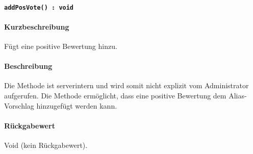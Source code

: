 \paragraph{\texttt{addPosVote() : void}}%
\paragraph*{Kurzbeschreibung}
Fügt eine positive Bewertung hinzu.
\paragraph*{Beschreibung}
Die Methode ist serverintern und wird somit nicht explizit vom Administrator aufgerufen.
Die Methode ermöglicht, dass eine positive Bewertung dem Alias-Vorschlag hinzugefügt werden kann.
\paragraph*{Rückgabewert}
Void (kein Rückgabewert).
